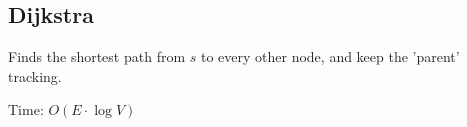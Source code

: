 \subsection {Dijkstra}

Finds the shortest path from $s$ to every other node, and keep the 'parent' tracking.

Time: $O(E \cdot \log{V})$


